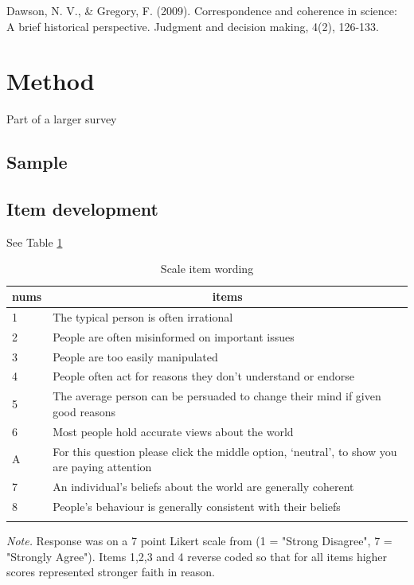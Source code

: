 \documentclass[
  ,jou,floatsintext]{apa6}
\begin{document}
Dawson, N. V., \& Gregory, F. (2009). Correspondence and coherence in science: A brief historical perspective. Judgment and decision making, 4(2), 126-133.

\hypertarget{method}{%
\section{Method}\label{method}}

Part of a larger survey

\hypertarget{sample}{%
\subsection{Sample}\label{sample}}

\hypertarget{item-development}{%
\subsection{Item development}\label{item-development}}

See Table \ref{tab:items}

\begin{table}[tbp]

\begin{center}
\begin{threeparttable}

\caption{\label{tab:items}Scale item wording}

\begin{tabular}{ll}
\toprule
nums & \multicolumn{1}{c}{items}\\
\midrule
1 & The typical person is often irrational\\
2 & People are often misinformed on important issues\\
3 & People are too easily manipulated\\
4 & People often act for reasons they don’t understand or endorse\\
5 & The average person can be persuaded to change their mind if given good reasons\\
6 & Most people hold accurate views about the world\\
A & For this question please click the middle option, ‘neutral’, to show you are paying attention\\
7 & An individual's beliefs about the world are generally coherent\\
8 & People's behaviour is generally consistent with their beliefs\\
\bottomrule
\addlinespace
\end{tabular}

\begin{tablenotes}[para]
\normalsize{\textit{Note.} Response was on a 7 point Likert scale from (1 = "Strong Disagree", 7 = "Strongly Agree"). Items 1,2,3 and 4 reverse coded so that for all items higher scores represented stronger faith in reason.}
\end{tablenotes}

\end{threeparttable}
\end{center}

\end{table}
\end{document}
